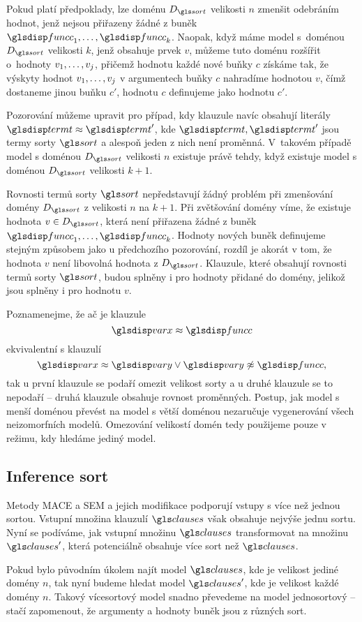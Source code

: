 Pokud platí předpoklady, lze doménu $D_\sort$ velikosti
$n$ zmenšit odebráním hodnot, jenž nejsou přiřazeny žádné z buněk
$\funcC_1 \comdots \funcC_k$.
Naopak, když máme model s~doménou $D_\sort$ velikosti $k$,
jenž obsahuje prvek $v$, můžeme tuto doménu rozšířit o~hodnoty
$v_1 , \ldots, v_j$, přičemž hodnotu každé nové buňky $c$ získáme
tak, že výskyty hodnot $v_1 , \ldots, v_j$ v argumentech buňky $c$ nahradíme
hodnotou $v$, čímž dostaneme jinou buňku $c'$, hodnotu $c$
definujeme jako hodnotu $c'$.

Pozorování můžeme upravit pro případ, kdy klauzule navíc obsahují
literály $\term \approx \term'$,
kde $\term, \term'$ jsou termy sorty $\sort$ a alespoň jeden
z nich není proměnná.
V~takovém případě model s doménou $D_\sort$ velikosti $n$ existuje
právě tehdy, když existuje model s doménou $D_\sort$ velikosti $k + 1$.

Rovnosti termů sorty $\sort$ nepředstavují žádný problém při
zmenšování domény $D_\sort$ z velikosti $n$ na $k + 1$. Při zvětšování domény
víme, že existuje hodnota $v \in D_\sort$, která není přiřazena žádné z buněk
$\funcC_1 \comdots \funcC_k$.
Hodnoty nových buněk definujeme stejným způsobem jako
u předchozího pozorování, rozdíl je akorát v tom,
že hodnota $v$ není libovolná hodnota z $D_\sort$.
Klauzule, které obsahují rovnosti
termů sorty $\sort$, budou splněny i pro hodnoty přidané do domény,
jelikož jsou splněny i pro hodnotu $v$.

Poznamenejme, že ač je klauzule
\[
  \var \approx \funcC
\]
ekvivalentní s klauzulí
\[
  \var \approx \varY \vee \varY \not\approx \funcC,
\]
tak u první klauzule se podaří omezit velikost sorty a u druhé
klauzule se to nepodaří -- druhá klauzule obsahuje rovnost proměnných.
Postup, jak model s menší doménou převést na model s větší doménou
nezaručuje vygenerování všech neizomorfních modelů.
Omezování velikostí domén tedy použijeme pouze v režimu,
kdy hledáme jediný model.

\subsection{Inference sort}

Metody MACE a SEM a jejich modifikace podporují vstupy s více než
jednou sortou. Vstupní množina klauzulí $\clauses$ však obsahuje
nejvýše jednu sortu. Nyní se podíváme, jak vstupní množinu
$\clauses$ transformovat
na množinu $\clauses'$, která potenciálně
obsahuje více sort než $\clauses$.

Pokud bylo původním úkolem najít model $\clauses$, kde je velikost
jediné domény $n$, tak nyní budeme hledat model $\clauses'$,
kde je velikost každé domény $n$. Takový vícesortový
model snadno převedeme na model jednosortový -- stačí zapomenout,
že argumenty a hodnoty buněk jsou z různých sort.

